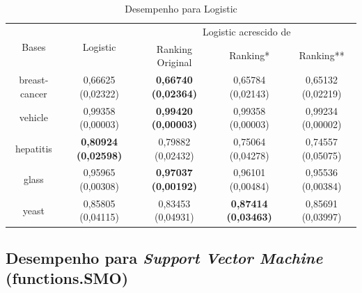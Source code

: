 \begin{table}[h]
    \begin{tabular}{ c c c c c }
        \hline

        \multirow{2}{*}{Bases} & \multirow{2}{*}{Logistic} & \multicolumn{3}{c}{Logistic acrescido de} \\ \cline{3-5}
        & & {\small Ranking Original} & {\small Ranking*} & {\small  Ranking**} \\
        
        \hline
        
        breast-cancer & {\small 0,66625 (0,02322)} & {\small \textbf{0,66740 (0,02364)}} & {\small 0,65784 (0,02143)} & {\small 0,65132 (0,02219)} \\
        vehicle & {\small 0,99358 (0,00003)} & {\small \textbf{0,99420 (0,00003)}} & {\small 0,99358 (0,00003)} & {\small 0,99234 (0,00002)} \\
        hepatitis & {\small \textbf{0,80924 (0,02598)}} & {\small 0,79882 (0,02432)} & {\small 0,75064 (0,04278)} & {\small 0,74557 (0,05075)} \\
        glass & {\small 0,95965 (0,00308)} & {\small \textbf{0,97037 (0,00192)}} & {\small 0,96101 (0,00484)} & {\small 0,95536 (0,00384)} \\
        yeast & 0{\small ,85805 (0,04115)} & {\small 0,83453 (0,04931)} & {\small \textbf{0,87414 (0,03463)}} & {\small 0,85691 (0,03997)} \\
    
        \hline
    \end{tabular}
    
    \caption{Desempenho para Logistic}
    \label{logistic_results_table}
\end{table}

\subsection{Desempenho para \emph{Support Vector Machine} (functions.SMO)}

